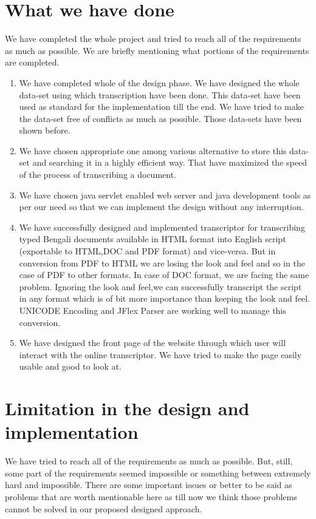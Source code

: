 \documentclass[12pt,oneside,openany,a4paper]{book}
\begin{document}
\section{What we have done}
We have completed the whole project and tried to reach all of the requirements as much as possible. We are briefly mentioning what portions of the requirements are completed.
\begin{enumerate}[label=\roman*)]
\item{We have completed whole of the design phase. We have designed the whole data-set using which transcription have been done. This data-set have been used as standard for the implementation till the end. We have tried to make the data-set free of conflicts as much as possible. Those data-sets have been shown before.}
\item{We have chosen appropriate one among various alternative to store this data-set and searching it in a highly efficient way. That have maximized the speed of the process of transcribing a document.}
\item{We have chosen java servlet enabled web server and java development tools as per our need so that we can implement the design without any interruption.}
\item{We have successfully designed and implemented transcriptor for transcribing typed Bengali documents available in HTML format into English script (exportable to HTML,DOC and PDF format) and vice-versa. But in conversion from PDF to HTML we are losing the look and feel and so in the case of PDF to other formats. In case of DOC format, we are facing the same problem. Ignoring the look and feel,we can successfully transcript the script in any format which is of bit more importance than keeping the look and feel. UNICODE Encoding and JFlex Parser are working well to manage this conversion.}
\item{We have designed the front page of the website through which user will interact with the online transcriptor. We have tried to make the page easily usable and good to look at.}
\end{enumerate}

\vspace{0.5cm}
\par

\section{Limitation in the design and implementation}
We have tried to reach all of the requirements as much as possible. But, still, some part of the requirements seemed impossible or something between extremely hard and impossible. There are some important issues or better to be said as problems that are worth mentionable here as till now we think those problems cannot be solved in our proposed designed approach.
\end{document}
